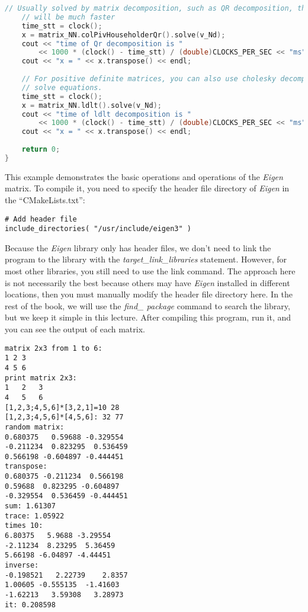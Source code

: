 \begin{lstlisting}[language=c++,caption=slambook2/ch3/useEigen/eigenMatrix.cpp]
    // Usually solved by matrix decomposition, such as QR decomposition, the speed
    // will be much faster
    time_stt = clock();
    x = matrix_NN.colPivHouseholderQr().solve(v_Nd);
    cout << "time of Qr decomposition is "
	    << 1000 * (clock() - time_stt) / (double)CLOCKS_PER_SEC << "ms" << endl;
    cout << "x = " << x.transpose() << endl;
    
    // For positive definite matrices, you can also use cholesky decomposition to
    // solve equations.
    time_stt = clock();
    x = matrix_NN.ldlt().solve(v_Nd);
    cout << "time of ldlt decomposition is "
	    << 1000 * (clock() - time_stt) / (double)CLOCKS_PER_SEC << "ms" << endl;
    cout << "x = " << x.transpose() << endl;
    
    return 0;
}
\end{lstlisting}

This example demonstrates the basic operations and operations of the \textit{Eigen} matrix. To compile it, you need to specify the header file directory of \textit{Eigen} in the ``CMakeLists.txt'':
\begin{lstlisting}[caption=slambook2/ch3/useEigen/CMakeLists.txt]
# Add header file
include_directories( "/usr/include/eigen3" )
\end{lstlisting}

Because the \textit{Eigen} library only has header files, we don't need to link the program to the library with the \textit{target\_link\_libraries} statement. However, for most other libraries, you still need to use the link command. The approach here is not necessarily the best because others may have \textit{Eigen} installed in different locations, then you must manually modify the header file directory here. In the rest of the book, we will use the \textit{find\_ package} command to search the library, but we keep it simple in this lecture. After compiling this program, run it, and you can see the output of each matrix.

\begin{lstlisting}[caption=Terminal output:]
% build/eigenMatrix
matrix 2x3 from 1 to 6: 
1 2 3
4 5 6
print matrix 2x3: 
1	2	3	
4	5	6	
[1,2,3;4,5,6]*[3,2,1]=10 28
[1,2,3;4,5,6]*[4,5,6]: 32 77
random matrix: 
0.680375   0.59688 -0.329554
-0.211234  0.823295  0.536459
0.566198 -0.604897 -0.444451
transpose: 
0.680375 -0.211234  0.566198
0.59688  0.823295 -0.604897
-0.329554  0.536459 -0.444451
sum: 1.61307
trace: 1.05922
times 10: 
6.80375   5.9688 -3.29554
-2.11234  8.23295  5.36459
5.66198 -6.04897 -4.44451
inverse: 
-0.198521   2.22739    2.8357
1.00605 -0.555135  -1.41603
-1.62213   3.59308   3.28973
it: 0.208598
\end{lstlisting}


